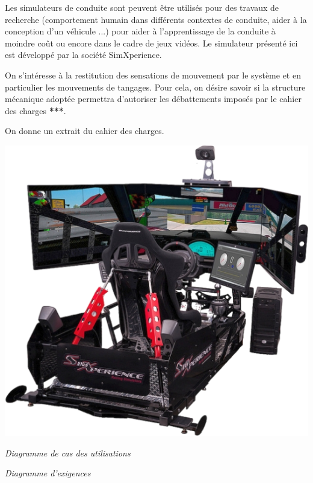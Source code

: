 \documentclass[10pt]{article}
\begin{document}
\begin{minipage}[c]{.7\linewidth}
Les simulateurs de conduite sont peuvent être utilisés pour des travaux de recherche (comportement humain dans différents contextes de conduite, aider à la conception d'un véhicule ...) pour aider à l'apprentissage de la conduite à moindre coût ou encore dans le cadre de jeux vidéos. Le simulateur présenté ici est développé par la société SimXperience. 
\begin{obj} 

On s'intéresse à la restitution des sensations de mouvement par le système et en particulier les mouvements de tangages. Pour cela, on désire savoir si la structure mécanique adoptée permettra d'autoriser les débattements imposés par le cahier des charges \textbf{***}. 
\end{obj}

 On donne un extrait du cahier des charges.
 
\end{minipage} \hfill
\begin{minipage}[c]{.25\linewidth}
\begin{center}
\includegraphics[width=\textwidth]{images/Simulateur1}
\end{center}
\end{minipage}

\begin{minipage}[c]{.33\linewidth}
\begin{center}

\textit{Diagramme de cas des utilisations}
\end{center}
\end{minipage} \hfill
\begin{minipage}[c]{.63\linewidth}
\begin{center}

\textit{Diagramme d'exigences}
\end{center}
\end{minipage}
\end{document}
